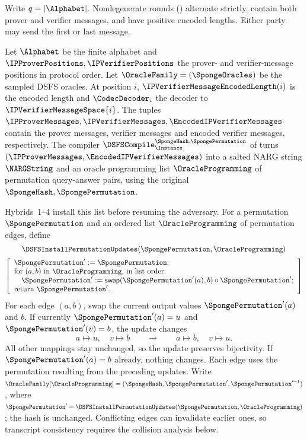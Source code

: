 Write \(q=|\Alphabet|\). Nondegenerate rounds () alternate strictly, contain both prover and verifier messages, and have positive encoded lengths. Either party may send the first or last message.
\begin{definition}
\label{def:dsfs_zk_hybrids}
Let \(\Alphabet\) be the finite alphabet and \(\IPProverPositions,\IPVerifierPositions\) the prover- and verifier-message positions in protocol order. Let \(\OracleFamily=(\SpongeOracles)\) be the sampled DSFS oracles. At position \(i\), \(\IPVerifierMessageEncodedLength(i)\) is the encoded length and \(\CodecDecoder_i\) the decoder to \(\IPVerifierMessageSpace{i}\). The tuples \(\IPProverMessages,\IPVerifierMessages,\EncodedIPVerifierMessages\) contain the prover messages, verifier messages and encoded verifier messages, respectively. The compiler \(\DSFSCompile^{\SpongeHash,\SpongePermutation}_{\Instance}\) of  turns \((\IPProverMessages,\EncodedIPVerifierMessages)\) into a salted NARG string \(\NARGString\) and an oracle programming list \(\OracleProgramming\) of permutation query-answer pairs, using the original \(\SpongeHash,\SpongePermutation\).

Hybrids~1--4 install this list before resuming the adversary. For a permutation \(\SpongePermutation\) and an ordered list \(\OracleProgramming\) of permutation edges, define
\begin{equation*}
\begin{gathered}
  \DSFSInstallPermutationUpdates(\SpongePermutation,\OracleProgramming)\\[2pt]
  \left[\begin{array}{l}
    \SpongePermutation':=\SpongePermutation;\\
    \text{for }(a,b)\text{ in }\OracleProgramming\text{, in list order:}\\
    \quad \SpongePermutation':=\mathsf{swap}(\SpongePermutation'(a),b)\circ \SpongePermutation';\\
    \text{return }\SpongePermutation'.
  \end{array}\right]
\end{gathered}
\end{equation*}
For each edge \((a,b)\), swap the current output values \(\SpongePermutation'(a)\) and \(b\). If currently \(\SpongePermutation'(a)=u\) and \(\SpongePermutation'(v)=b\), the update changes
\begin{equation*}
  a\mapsto u,\quad v\mapsto b
  \qquad\longrightarrow\qquad
  a\mapsto b,\quad v\mapsto u.
\end{equation*}
All other mappings stay unchanged, so the update preserves bijectivity. If \(\SpongePermutation'(a)=b\) already, nothing changes. Each edge uses the permutation resulting from the preceding updates. Write \(\OracleFamily[\OracleProgramming]=(\SpongeHash,\SpongePermutation',\SpongePermutation'^{-1})\), where \(\SpongePermutation'=\DSFSInstallPermutationUpdates(\SpongePermutation,\OracleProgramming)\); the hash is unchanged. Conflicting edges can invalidate earlier ones, so transcript consistency requires the collision analysis below.


\end{definition}
